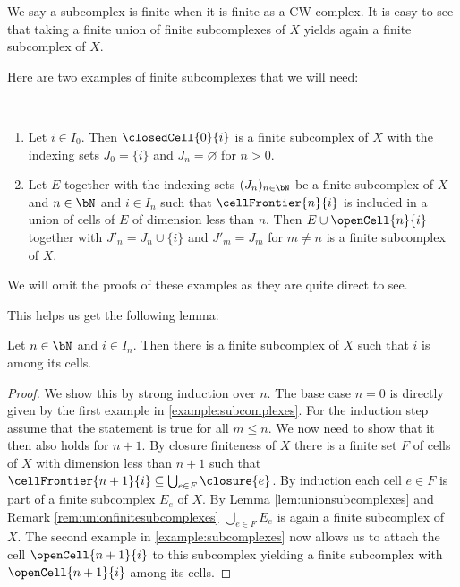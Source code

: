 \begin{rem} \label{rem:unionfinitesubcomplexes}
    We say a subcomplex is finite when it is finite as a CW-complex.
    It is easy to see that taking a finite union of finite subcomplexes of $X$ yields again a finite subcomplex of $X$.
\end{rem}

Here are two examples of finite subcomplexes that we will need:

\begin{example} \label{example:subcomplexes} ~
    \begin{enumerate}
        \item Let $i \in I_0$. Then $\closedCell{0}{i}$ is a finite subcomplex of $X$ with the indexing sets $J_0 = \{i\}$ and $J_n = \varnothing$ for $n > 0$.
        \item Let $E$ together with the indexing sets $(J_n)_{n \in \bN}$ be a finite subcomplex of $X$ and $n \in \bN$ and $i \in I_n$ such that $\cellFrontier{n}{i}$ is included in a union of cells of $E$ of dimension less than $n$. 
        Then $E \cup \openCell{n}{i}$ together with $J'_n = J_n \cup \{i\}$ and $J'_m = J_m$ for $m \ne n$ is a finite subcomplex of $X$.
       \end{enumerate}
\end{example}

We will omit the proofs of these examples as they are quite direct to see. 

This helps us get the following lemma: 

\begin{lem} \label{lem:cellinfinitesubcomplex}
    Let $n \in \bN$ and $i \in I_n$. 
    Then there is a finite subcomplex of $X$ such that $i$ is among its cells. 
\end{lem}
\begin{proof}
    We show this by strong induction over $n$. 
    The base case $n = 0$ is directly given by the first example in \ref{example:subcomplexes}. 
    For the induction step assume that the statement is true for all $m \le n$.
    We now need to show that it then also holds for $n + 1$. 
    By closure finiteness of $X$ there is a finite set $F$ of cells of $X$ with dimension less than $n + 1$ such that $\cellFrontier{n  + 1}{i} \subseteq \bigcup_{e \in F} \closure{e}$. 
    By induction each cell $e \in F$ is part of a finite subcomplex $E_e$ of $X$. 
    By Lemma \ref{lem:unionsubcomplexes} and Remark \ref{rem:unionfinitesubcomplexes} $\bigcup_{e \in F}E_e$ is again a finite subcomplex of $X$. 
    The second example in \ref{example:subcomplexes} now allows us to attach the cell $\openCell{n + 1}{i}$ to this subcomplex yielding a finite subcomplex with $\openCell{n + 1}{i}$ among its cells.
\end{proof}


